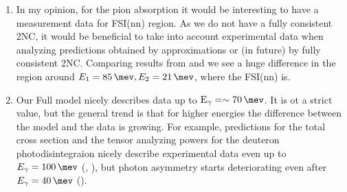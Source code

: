 \begin{enumerate}
    \item In my opinion, for the pion absorption it would be interesting to have a measurement data for FSI(nn) region. As we do not have a fully consistent 2NC, it would be beneficial to take into account experimental data when analyzing predictions obtained by approximations or (in future) by fully consistent 2NC. Comparing results from   and  we see a huge difference in the region around $E_1=\SI{85}{\mev}, E_2 = \SI{21}{\mev}$, where the FSI(nn) is.
    \item Our Full model nicely describes data up to $\text{E}_\gamma = \sim\SI{70}{\mev}$. It is ot a strict value, but the general trend is that for higher energies the difference between the model and the data is growing. For example, predictions for the total cross section and the tensor analyzing powers for the deuteron photodisintegraion nicely describe experimental data even up to $E_\gamma = \SI{100}{\mev}$ (, ), but photon asymmetry starts deteriorating even after $E_\gamma = \SI{40}{\mev}$ ().
\end{enumerate}